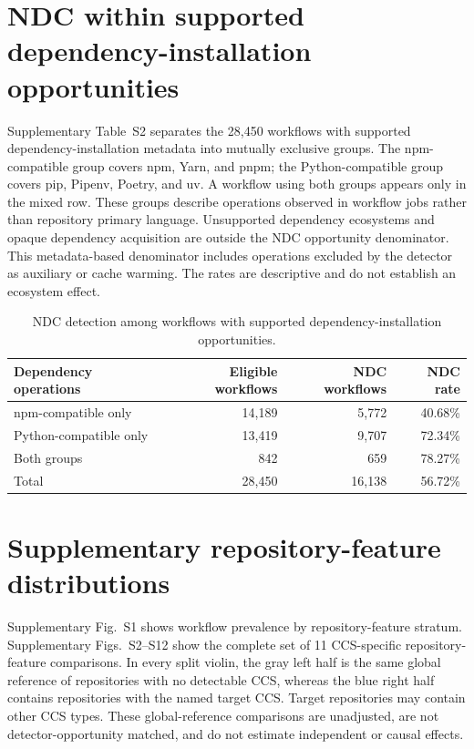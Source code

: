 \documentclass[a4paper]{article}
\begin{document}
\section*{NDC within supported dependency-installation opportunities}

Supplementary Table~S2 separates the 28,450 workflows with supported
dependency-installation metadata into mutually exclusive groups. The npm-compatible group covers npm, Yarn, and pnpm; the
Python-compatible group covers pip, Pipenv, Poetry, and uv. A workflow using
both groups appears only in the mixed row. These groups describe operations
observed in workflow jobs rather than repository primary language. Unsupported
dependency ecosystems and opaque dependency acquisition are outside the NDC
opportunity denominator. This metadata-based denominator includes operations excluded by the detector as auxiliary or cache warming. The rates are descriptive and do not establish an
ecosystem effect.

\begin{table}[H]
\centering
\small
\caption{NDC detection among workflows with supported dependency-installation opportunities.}
\label{tab:supp-ndc-opportunity}
\begin{tabular}{lrrr}
\hline
Dependency operations & Eligible workflows & NDC workflows & NDC rate\\
\hline
npm-compatible only & 14,189 & 5,772 & 40.68\%\\
Python-compatible only & 13,419 & 9,707 & 72.34\%\\
Both groups & 842 & 659 & 78.27\%\\
\hline
Total & 28,450 & 16,138 & 56.72\%\\
\hline
\end{tabular}
\end{table}

\section*{Supplementary repository-feature distributions}

Supplementary Fig.~S1 shows workflow prevalence by repository-feature stratum. Supplementary
Figs.~S2--S12 show the complete set of 11 CCS-specific repository-feature
comparisons. In every split violin, the gray left half is the
same global reference of repositories with no detectable CCS, whereas the
blue right half contains repositories with the named target CCS. Target
repositories may contain other CCS types. These global-reference comparisons are
unadjusted, are not detector-opportunity matched, and do not estimate
independent or causal effects.
\end{document}
